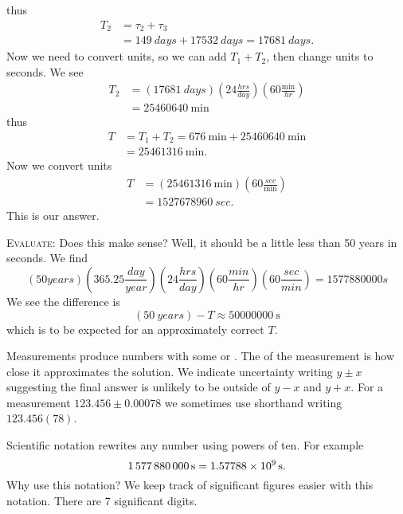 thus
\begin{equation}
\begin{split}
T_{2} &= \tau_2+\tau_3\\
&=\SI{149}{days}+\SI{17532}{days}=\SI{17681}{days}.
\end{split}
\end{equation}
Now we need to convert units, so we can add $T_1+T_2$, then
change units to seconds. We see
\begin{equation}
\begin{split}
T_{2} &= 
(\SI{17681}{days})\left(24\frac{\si{hrs}}{\si{day}}\right)
\left(60\frac{\si{\minute}}{\si{hr}}\right)\\
&= \SI{25460640}{\minute}
\end{split}
\end{equation}
thus
\begin{equation}
\begin{split}
T &= T_1+T_2 = \SI{676}{\minute} + \SI{25460640}{\minute}\\
&=\SI{25461316}{\minute}.
\end{split}
\end{equation}
Now we convert units
\begin{equation}
\begin{split}
T &= (\SI{25461316}{\minute})\left(60\frac{\si{sec}}{\si{\minute}}\right)\\
&=\SI{1527678960}{sec}.
\end{split}
\end{equation}
This is our answer.

\textsc{Evaluate:}
Does this make sense? Well, it should be a little less than 50
years in seconds. We find
\begin{equation}
\!(50\si{years})
\!\!\left(365.25\frac{\si{day}}{\si{year}}\right) 
\!\!\left(24\frac{\si{hrs}}{\si{day}}\right)
\!\!\left(60\frac{\si{min}}{\si{hr}}\right)
\!\!\left(60\frac{\si{sec}}{\si{min}}\right)
=1577880000\si{s}
\end{equation}
We see the difference is
\begin{equation}
(\SI{50}{years})-T\approx \SI{50000000}{\second}
\end{equation}
which is to be expected for an approximately correct $T$.

Measurements produce numbers with some 
or . The  of the measurement is
how close it approximates the solution. We indicate uncertainty
writing $y\pm x$ suggesting the final answer is unlikely to be
outside of $y-x$ and $y+x$. For a measurement $123.456\pm0.00078$
we sometimes use shorthand writing $123.456(78)$. 

Scientific notation rewrites any number using powers of ten.
For example
\begin{equation}
\SI{1577880000}{\second}
=\SI[parse-numbers = false]{1.57788\times10^{9}}{\second}.
\end{equation}
Why use this notation? We keep track of significant figures
easier with this notation. There are 7 significant digits.


